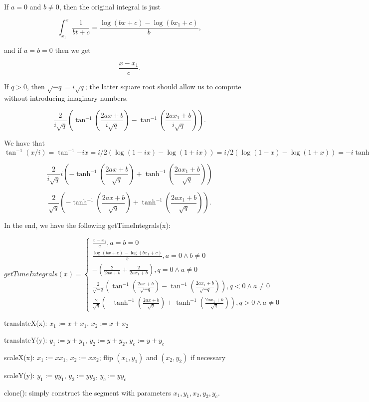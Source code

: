 \documentclass{article}
\begin{document}
{If $a = 0$ and $b\neq 0$, then the original integral is just

$$\int_{x_1}^x\frac{1}{bt+c}= \frac{\log(bx+c)-\log(bx_1+c)}{b},$$

and if $a=b=0$ then we get

$$\frac{x-x_1}{c}.$$

If $q>0$, then $\sqrt{-q}=i\sqrt{q}$; the latter square root should allow us to compute without introducing imaginary numbers.

$$\frac{2}{i\sqrt{q}}\left(\tan^{-1}\left(\frac{2ax+b}{i\sqrt{q}}\right)-\tan^{-1}\left(\frac{2ax_1+b}{i\sqrt{q}}\right)\right).$$

We have that $\tan^{-1}(x/i)=\tan^{-1}{-ix}=i/2(\log(1-ix)-\log(1+ix))=i/2(\log(1-x)-\log(1+x))=-i\tanh^{-1}{x}:$

$$\frac{2}{i\sqrt{q}}i\left(-\tanh^{-1}\left(\frac{2ax+b}{\sqrt{q}}\right)+\tanh^{-1}\left(\frac{2ax_1+b}{\sqrt{q}}\right)\right)$$

$$\frac{2}{\sqrt{q}}\left(-\tanh^{-1}\left(\frac{2ax+b}{\sqrt{q}}\right)+\tanh^{-1}\left(\frac{2ax_1+b}{\sqrt{q}}\right)\right).$$

In the end, we have the following getTimeIntegrals(x):

$$getTimeIntegrals(x)=\begin{cases}
\frac{x-x_1}{c}, a=b=0 \\
\frac{\log(bx+c)-\log(bx_1+c)}{b}, a=0 \land b\neq 0 \\
-\left(\frac{2}{2ax+b}+\frac{2}{2ax_1+b}\right), q=0 \land a\neq 0 \\
\frac{2}{\sqrt{-q}}\left(\tan^{-1}\left(\frac{2ax+b}{\sqrt{-q}}\right)-\tan^{-1}\left(\frac{2ax_1+b}{\sqrt{-q}}\right)\right), q<0 \land a\neq 0 \\
\frac{2}{\sqrt{q}}\left(-\tanh^{-1}\left(\frac{2ax+b}{\sqrt{q}}\right)+\tanh^{-1}\left(\frac{2ax_1+b}{\sqrt{q}}\right)\right), q>0 \land a\neq 0
\end{cases}$$

translateX(x): $x_1:=x+x_1$, $x_2:=x+x_2$

translateY(y): $y_1:=y+y_1$, $y_2:=y+y_2$, $y_c:=y+y_c$

scaleX(x): $x_1:=xx_1$, $x_2:=xx_2$; flip $(x_1, y_1)$ and $(x_2, y_2)$ if necessary

scaleY(y): $y_1:=yy_1$, $y_2:=yy_2$, $y_c:=yy_c$

clone(): simply construct the segment with parameters $x_1, y_1, x_2, y_2, y_c$.


}
\end{document}
